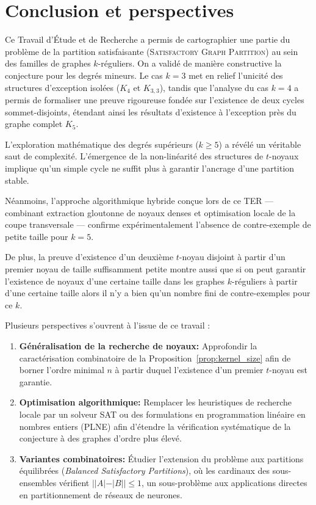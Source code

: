 \section{Conclusion et perspectives}\label{sec:conclusion}

Ce Travail d'Étude et de Recherche a permis de cartographier une partie du problème de la partition satisfaisante (\textsc{Satisfactory Graph Partition}) au sein des familles de graphes \(k\)-réguliers. 
On a validé de manière constructive la conjecture pour les degrés mineurs. 
Le cas \(k=3\) met en relief l'unicité des structures d'exception isolées (\(K_4\) et \(K_{3,3}\)), tandis que l'analyse du cas \(k=4\) a permis de formaliser une preuve rigoureuse fondée sur l'existence de deux cycles sommet-disjoints, étendant ainsi les résultats d'existence à l'exception près du graphe complet \(K_5\).

L'exploration mathématique des degrés supérieurs (\(k \geq 5\)) a révélé un véritable saut de complexité. 
L'émergence de la non-linéarité des structures de \(t\)-noyaux implique qu'un simple cycle ne suffit plus à garantir l'ancrage d'une partition stable.

Néanmoins, l'approche algorithmique hybride conçue lors de ce TER — combinant extraction gloutonne de noyaux denses et optimisation locale de la coupe transversale — confirme expérimentalement l'absence de contre-exemple de petite taille pour \(k=5\).

De plus, la preuve d'existence d'un deuxième \(t\)-noyau disjoint à partir d'un premier noyau de taille suffisamment petite montre aussi que si on peut garantir l'existence de noyaux d'une certaine taille dans les graphes \(k\)-réguliers à partir d'une certaine taille alors il n'y a bien qu'un nombre fini de contre-exemples pour ce \(k\).

Plusieurs perspectives s'ouvrent à l'issue de ce travail :
\begin{enumerate}
    \item \textbf{Généralisation de la recherche de noyaux:} Approfondir la caractérisation combinatoire de la Proposition~\ref{prop:kernel_size} afin de borner l'ordre minimal \(n\) à partir duquel l'existence d'un premier \(t\)-noyau est garantie.
    \item \textbf{Optimisation algorithmique:} Remplacer les heuristiques de recherche locale par un solveur SAT ou des formulations en programmation linéaire en nombres entiers (PLNE) afin d'étendre la vérification systématique de la conjecture à des graphes d'ordre plus élevé.
    \item \textbf{Variantes combinatoires:} Étudier l'extension du problème aux partitions équilibrées (\textit{Balanced Satisfactory Partitions}), où les cardinaux des sous-ensembles vérifient \(||A| - |B|| \leq 1\), un sous-problème aux applications directes en partitionnement de réseaux de neurones.
\end{enumerate}

